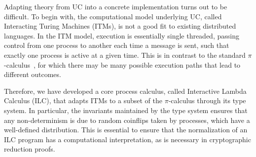 Adapting theory from UC into a concrete implementation turns out to be
difficult. To begin with, the computational model underlying UC, called
Interacting Turing Machines (ITMs), is not a good fit to existing distributed
languages. In the ITM model, execution is essentially single threaded, passing
control from one process to another each time a message is sent, such that
exactly one process is active at a given time. This is in contrast to the
standard $\pi$-calculus~\cite{milner1999communicating}, for which there may be
many possible execution paths that lead to different outcomes.

Therefore, we have developed a core process calculus, called Interactive Lambda
Calculus (ILC), that adapts ITMs to a subset of the $\pi$-calculus through its
type system. In particular, the invariants maintained by the type system ensures
that any non-determinism is due to random coinflips taken by processes, which
have a well-defined distribution. This is essential to ensure that the
normalization of an ILC program has a computational interpretation, as is
necessary in cryptographic reduction proofs.


